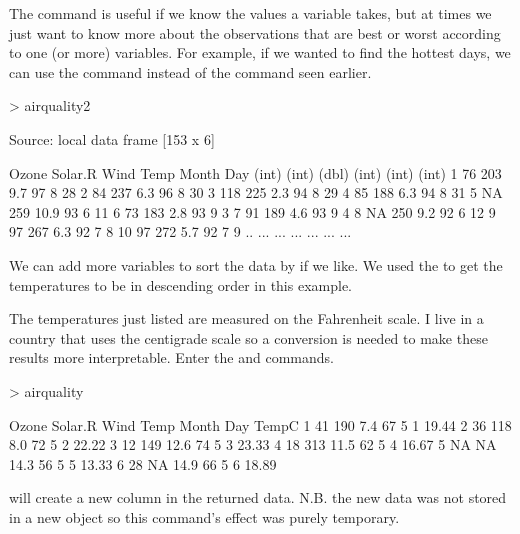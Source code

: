 The  command is useful if we know the values a variable takes, but at times we just want to know more about the observations that are best or worst according to one (or more) variables. For example, if we wanted to find the hottest days, we can use the  command instead of the  command seen earlier. 
\begin{Schunk}
\begin{Sinput}
> airquality2 %>% arrange(desc(Temp)) 
\end{Sinput}
\begin{Soutput}
Source: local data frame [153 x 6]

   Ozone Solar.R  Wind  Temp Month   Day
   (int)   (int) (dbl) (int) (int) (int)
1     76     203   9.7    97     8    28
2     84     237   6.3    96     8    30
3    118     225   2.3    94     8    29
4     85     188   6.3    94     8    31
5     NA     259  10.9    93     6    11
6     73     183   2.8    93     9     3
7     91     189   4.6    93     9     4
8     NA     250   9.2    92     6    12
9     97     267   6.3    92     7     8
10    97     272   5.7    92     7     9
..   ...     ...   ...   ...   ...   ...
\end{Soutput}
\end{Schunk}
We can add more variables to sort the data by if we like. We used the  to get the temperatures to be in descending order in this example. 
 
The temperatures just listed are measured on the Fahrenheit scale. I live in a country that uses the centigrade scale so a conversion is needed to make these results more interpretable. Enter the  and  
 commands.  
 
\begin{Schunk}
\begin{Sinput}
> airquality %>% mutate(TempC = (Temp - 32) * 5 / 9) %>% head() 
\end{Sinput}
\begin{Soutput}
  Ozone Solar.R Wind Temp Month Day TempC
1    41     190  7.4   67     5   1 19.44
2    36     118  8.0   72     5   2 22.22
3    12     149 12.6   74     5   3 23.33
4    18     313 11.5   62     5   4 16.67
5    NA      NA 14.3   56     5   5 13.33
6    28      NA 14.9   66     5   6 18.89
\end{Soutput}
\end{Schunk}
will create a new column in the returned data. N.B. the new data was not stored in a new object so this command's effect was purely temporary. 
 
